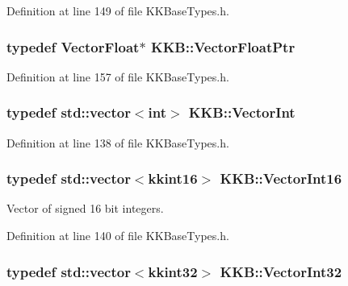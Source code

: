 Definition at line 149 of file K\+K\+Base\+Types.\+h.

\subsubsection[{\texorpdfstring{Vector\+Float\+Ptr}{VectorFloatPtr}}]{\setlength{\rightskip}{0pt plus 5cm}typedef {\bf Vector\+Float}$\ast$ {\bf K\+K\+B\+::\+Vector\+Float\+Ptr}}\hypertarget{namespace_k_k_b_a182835040a03db3c21a7ea4e46c84790}{}\label{namespace_k_k_b_a182835040a03db3c21a7ea4e46c84790}


Definition at line 157 of file K\+K\+Base\+Types.\+h.

\subsubsection[{\texorpdfstring{Vector\+Int}{VectorInt}}]{\setlength{\rightskip}{0pt plus 5cm}typedef std\+::vector$<$int$>$ {\bf K\+K\+B\+::\+Vector\+Int}}\hypertarget{namespace_k_k_b_a791ebe73f89917067a7aab9dbd817e45}{}\label{namespace_k_k_b_a791ebe73f89917067a7aab9dbd817e45}


Definition at line 138 of file K\+K\+Base\+Types.\+h.

\subsubsection[{\texorpdfstring{Vector\+Int16}{VectorInt16}}]{\setlength{\rightskip}{0pt plus 5cm}typedef std\+::vector$<${\bf kkint16}$>$ {\bf K\+K\+B\+::\+Vector\+Int16}}\hypertarget{namespace_k_k_b_ac2cb16557b269f092b9b8d05c90c0c9f}{}\label{namespace_k_k_b_ac2cb16557b269f092b9b8d05c90c0c9f}


Vector of signed 16 bit integers. 



Definition at line 140 of file K\+K\+Base\+Types.\+h.

\subsubsection[{\texorpdfstring{Vector\+Int32}{VectorInt32}}]{\setlength{\rightskip}{0pt plus 5cm}typedef std\+::vector$<${\bf kkint32}$>$ {\bf K\+K\+B\+::\+Vector\+Int32}}\hypertarget{namespace_k_k_b_adf8a10085d231870d8a072046d6cba10}{}\label{namespace_k_k_b_adf8a10085d231870d8a072046d6cba10}


